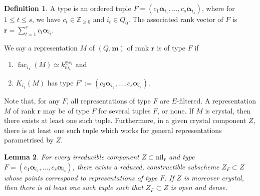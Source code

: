 \documentclass[a4paper,12pt]{article}
\theoremstyle{definition}
\newtheorem{definition}{Definition}[section]
\theoremstyle{plain}
\newtheorem{lemma}[definition]{Lemma}
\theoremstyle{remark}
\DeclareMathOperator{\fac}{fac}
\newcommand\bbZ{\mathbb{Z}}
\newcommand\bfalpha{\bm{\alpha}}
\newcommand\bfm{\mathbf{m}}
\newcommand\bfr{\mathbf{r}}
\begin{document}
\begin{definition}\label{def/filtrationType}
A type is an ordered tuple $F=(c_1\bfalpha_{i_1},\ldots,c_s\bfalpha_{i_s})$, where for $1\leq t\leq s$, we have $c_t\in\bbZ_{\geq0}$ and $i_t\in Q_0$. The associated rank vector of $F$ is $\bfr=\sum_{t=1}^sc_t\bfalpha_{i_t}$. 

We say a representation $M$ of $(Q,\bfm)$ of rank $\bfr$ is of type $F$ if 
\begin{enumerate}[nosep, label=\roman*)]
    \item $\fac_{i_1}(M)\simeq k_{m_{i_1}}^{\oplus c_1}$ and
    \item $K_{i_1}(M)$ has type $F':=(c_2\bfalpha_{i_2},\ldots,c_s\bfalpha_{i_s})$.
\end{enumerate}
\end{definition}

Note that, for any $F$, all representations of type $F$ are $E$-filtered. A representation $M$ of rank $\bfr$ may be of type $F$ for several tuples $F$, or none. If $M$ is crystal, then there exists at least one such tuple. Furthermore, in a given crystal component $Z$, there is at least one such tuple which works for general representations parametrised by $Z$.

\begin{lemma}\label{Lem/typeCrystalComponent}
For every irreducible component $Z\subset\mathrm{nil}_\bfr$ and type $F=(c_1\bfalpha_{i_1},\ldots,c_s\bfalpha_{i_s})$, there exists a reduced, constructible subscheme $Z_F\subset Z$ whose points correspond to representations of type $F$. If $Z$ is moreover crystal, then there is at least one such tuple such that $Z_F\subset Z$ is open and dense.
\end{lemma}
\end{document}
